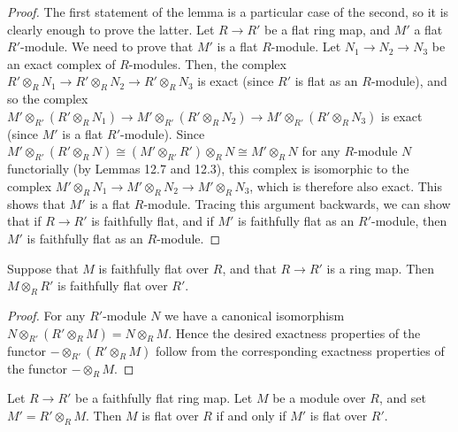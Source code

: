 \begin{proof}
	The first statement of the lemma is a particular case of the
	second, so it is clearly enough to prove the latter. Let
	$R \to R'$ be a flat ring map, and $M'$ a flat $R'$-module.
	We need to prove that $M'$ is a flat $R$-module. Let
	$N_1 \to N_2 \to N_3$ be an exact complex of $R$-modules.
	Then, the complex $R' \otimes_R N_1 \to
	R' \otimes_R N_2 \to R' \otimes_R N_3$ is exact (since $R'$
	is flat as an $R$-module), and so the complex
	$M' \otimes_{R'} \left(R' \otimes_R N_1\right)
	\to M' \otimes_{R'} \left(R' \otimes_R N_2\right)
	\to M' \otimes_{R'} \left(R' \otimes_R N_3\right)$ is
	exact (since $M'$ is a flat $R'$-module). Since
	$M' \otimes_{R'} \left(R' \otimes_R N\right)
	\cong \left(M' \otimes_{R'} R'\right) \otimes_R N
	\cong M' \otimes_R N$ for any $R$-module $N$ functorially
	(by Lemmas 12.7 and
	12.3), this complex is isomorphic
	to the complex
	$M' \otimes_R N_1 \to M' \otimes_R N_2 \to M' \otimes_R N_3$,
	which is therefore also exact. This shows that $M'$ is a flat
	$R$-module. Tracing this argument backwards, we can show
	that if $R \to R'$ is faithfully flat, and if $M'$ is
	faithfully flat as an $R'$-module, then $M'$ is faithfully
	flat as an $R$-module.
\end{proof}

\begin{lemma}\cite[\href{https://stacks.math.columbia.edu/tag/00HI}{Lemma 00HI}]{stacks-project}
	\label{lemma-flat-base-change}
	Suppose that $M$ is faithfully flat over $R$, and that $R \to R'$
	is a ring map. Then $M \otimes_R R'$ is faithfully flat over $R'$.
\end{lemma}

\begin{proof}
	For any $R'$-module $N$ we have a canonical
	isomorphism $N \otimes_{R'} (R'\otimes_R M)
	= N \otimes_R M$. Hence the desired exactness properties of the functor
	$-\otimes_{R'}(R'\otimes_R M)$ follow from
	the corresponding exactness properties of the functor $-\otimes_R M$.
\end{proof}

\begin{lemma}\cite[\href{https://stacks.math.columbia.edu/tag/00HJ}{Lemma 00HJ}]{stacks-project}
	\label{lemma-flatness-descends}
	Let $R \to R'$ be a faithfully flat ring map.
	Let $M$ be a module over $R$, and set $M' = R' \otimes_R M$.
	Then $M$ is flat over $R$ if and only if $M'$ is flat over $R'$.
\end{lemma}

